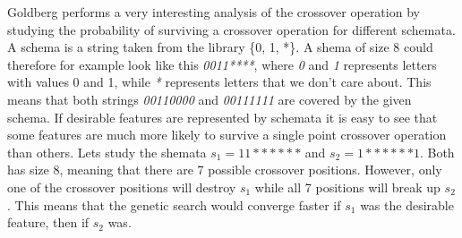 \documentclass{article}
\begin{document}
\noindent Goldberg performs a very interesting analysis of the crossover operation by studying the probability of surviving a crossover operation for different schemata. A schema is a string taken from the library \{0, 1, *\}.  A shema of size 8 could therefore for example look like this \textit{0011****}, where \textit{0} and \textit{1} represents letters with values 0 and 1, while \textit{*} represents letters that we don't care about. This means that both strings \textit{00110000} and \textit{00111111} are covered by the given schema. If desirable features are represented by schemata it is easy to see that some features are much more likely to survive a single point crossover operation than others. Lets study the shemata $s_1 = 11******$ and $s_2  = 1******1$. Both has size 8, meaning that there are 7 possible crossover positions. However, only one of the crossover positions will destroy $s_1$ while all 7 positions will break up $s_2$. This means that the genetic search would converge faster if $s_1$ was the desirable feature, then if $s_2$ was.
\end{document}
